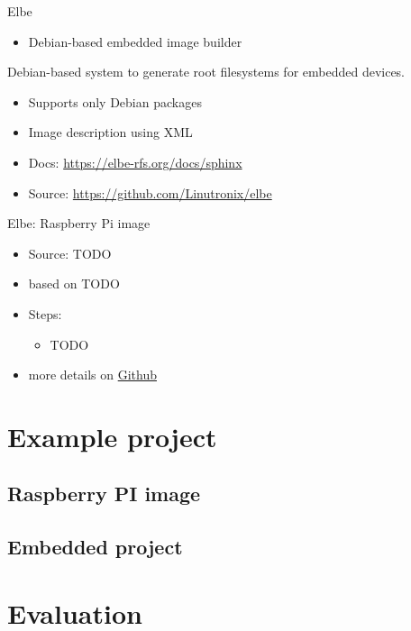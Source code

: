 \documentclass{beamer}
\begin{document}
\begin{frame}{Elbe}
	\begin{itemize}
		\item Debian-based embedded image builder
	\end{itemize}
	\begin{definition} 
		Debian-based system to generate root filesystems for embedded devices.
	\end{definition}
	\begin{itemize}
		\item Supports only Debian packages
		\item Image description using XML
		\item Docs: \url{https://elbe-rfs.org/docs/sphinx}
		\item Source: \url{https://github.com/Linutronix/elbe}
	\end{itemize}
\end{frame}

\begin{frame}{Elbe: Raspberry Pi image}
	\begin{itemize}
		\item Source: TODO
		\item based on TODO
		\item Steps:
		\begin{itemize}
			\item TODO
		\end{itemize}
		\item more details on \href{https://github.com/tomirgang/eh21_maintainable_linux/tree/main/examples/first_build_rpi4/elbe}{Github}
	\end{itemize}
\end{frame}

\section{Example project}

\subsection{Raspberry PI image}


\subsection{Embedded project}


\section{Evaluation}





\end{document}
